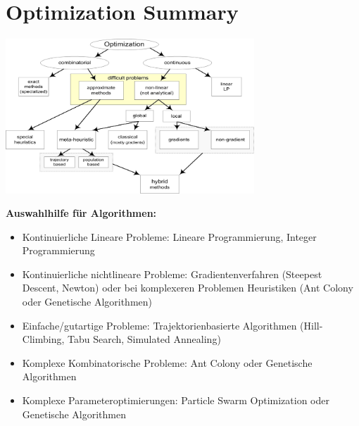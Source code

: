 \section{Optimization Summary}

\begin{center}
\includegraphics[width=0.7\textwidth]{./Content/OptimizationSummary/Summary}
\end{center}

\textbf{Auswahlhilfe für Algorithmen:}
  \begin{itemize}
    \item Kontinuierliche Lineare Probleme: Lineare Programmierung, Integer Programmierung
    \item Kontinuierliche nichtlineare Probleme: Gradientenverfahren (Steepest Descent, Newton) oder bei komplexeren Problemen Heuristiken (Ant Colony oder Genetische Algorithmen)
    \item Einfache/gutartige Probleme: Trajektorienbasierte Algorithmen (Hill-Climbing, Tabu Search, Simulated Annealing)
    \item Komplexe Kombinatorische Probleme: Ant Colony oder Genetische Algorithmen
    \item Komplexe Parameteroptimierungen: Particle Swarm Optimization oder Genetische Algorithmen
  \end{itemize}

